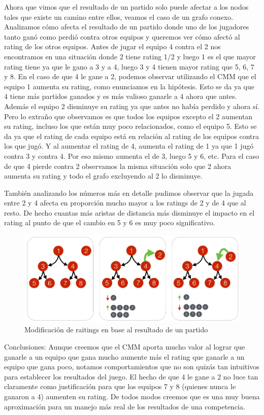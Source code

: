 Ahora que vimos que el resultado de un partido solo puede afectar a los nodos tales que existe un camino entre ellos, veamos el caso de un grafo conexo. Analizamos c\'omo afecta el resultado de un partido donde uno de los jugadores tanto gan\'o como perdi\'o contra otros equipos y queremos ver c\'omo afect\'o al rating de los otros equipos.
Antes de jugar el equipo 4 contra el 2 nos encontramos en una situaci\'on donde 2 tiene rating 1/2 y luego 1 es el que mayor rating tiene ya que le gano a 3 y a 4, luego 3 y 4 tienen mayor rating que 5, 6, 7 y 8.
En el caso de que 4 le gane a 2, podemos observar utilizando el CMM que el equipo 1 aumenta su rating, como enunciamos en la hip\'otesis. Esto se da ya que 4 tiene m\'as partidos ganados y es m\'as valioso ganarle a 4 ahora que antes. Adem\'as el equipo 2 disminuye su rating ya que antes no hab\'ia perdido y ahora s\'i. Pero lo extraño que observamos es que todos los equipos excepto el 2 aumentan su rating, incluso los que est\'an muy poco relacionados, como el equipo 5. Esto se da ya que el rating de cada equipo est\'a en relaci\'on al rating de los equipos contra los que jug\'o. Y al aumentar el rating de 4, aumenta el rating de 1 ya que 1 jug\'o contra 3 y contra 4. Por eso mismo aumenta el de 3, luego 5 y 6, etc.
Para el caso de que 4 pierde contra 2 observamos la misma situaci\'on solo que 2 ahora aumenta su rating y todo el grafo excluyendo al 2 lo disminuye.

Tambi\'en analizando los n\'umeros m\'as en detalle pudimos observar que la jugada entre 2 y 4 afecta en proporci\'on mucho mayor a los ratings de 2 y de 4 que al resto. De hecho cuantas m\'as aristas de distancia m\'as disminuye el impacto en el rating al punto de que el cambio en 5 y 6 es muy poco significativo.

\begin{figure}[h!]
  \begin{center}
	\includegraphics[scale=0.50]{imagenes/cualitative/fairness/fairness3.png}
	\caption{Modificaci\'on de raitings en base al resultado de un partido}
	\label{bChange}
  \end{center}
\end{figure}

Conclusiones: Aunque creemos que el CMM aporta mucho valor al lograr que ganarle a un equipo que gana mucho aumente m\'as el rating que ganarle a un equipo que gana poco, notamos comportamientos que no son quiz\'as tan intuitivos para establecer los resultados del juego. El hecho de que 4 le gane a 2 no luce tan claramente como justificaci\'on para que los equipos 7 y 8 (quienes nunca le ganaron a 4) aumenten su rating. De todos modos creemos que es una muy buena aproximaci\'on para un manejo m\'as real de los resultados de una competencia.

